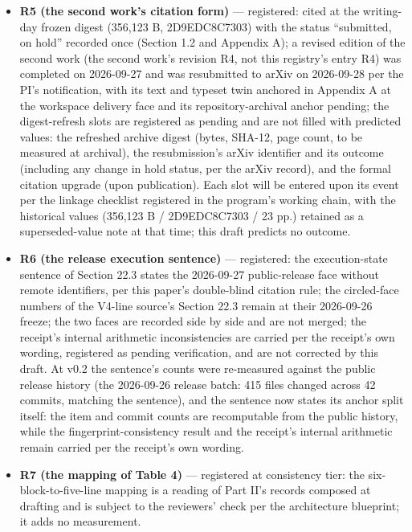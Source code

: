 \documentclass[11pt]{article}
\begin{document}
\begin{itemize}[leftmargin=1.6em,itemsep=2pt,parsep=0pt,topsep=3pt]
citations (E-40.1, E-40.2). The registration follows the R1–R3 precedent of concise, registered facts: the source documents are not transcribed, none of them enters the References, and the confidential-source discipline of C.4 is unaffected—the calibration note and the weekly-report family remain outside the citation surface, carried by fingerprint only.
\item \textbf{R5 (the second work's citation form)} — registered: cited at the writing-day frozen digest (356,123 B, 2D9EDC8C7303) with the status ``submitted, on hold'' recorded once (Section 1.2 and Appendix A); a revised edition of the second work (the second work's revision R4, not this registry's entry R4) was completed on 2026-09-27 and was resubmitted to arXiv on 2026-09-28 per the PI's notification, with its text and typeset twin anchored in Appendix A at the workspace delivery face and its repository-archival anchor pending; the digest-refresh slots are registered as pending and are not filled with predicted values: the refreshed archive digest (bytes, SHA-12, page count, to be measured at archival), the resubmission's arXiv identifier and its outcome (including any change in hold status, per the arXiv record), and the formal citation upgrade (upon publication). Each slot will be entered upon its event per the linkage checklist registered in the program's working chain, with the historical values (356,123 B / 2D9EDC8C7303 / 23 pp.) retained as a superseded-value note at that time; this draft predicts no outcome.
\item \textbf{R6 (the release execution sentence)} — registered: the execution-state sentence of Section 22.3 states the 2026-09-27 public-release face without remote identifiers, per this paper's double-blind citation rule; the circled-face numbers of the V4-line source's Section 22.3 remain at their 2026-09-26 freeze; the two faces are recorded side by side and are not merged; the receipt's internal arithmetic inconsistencies are carried per the receipt's own wording, registered as pending verification, and are not corrected by this draft. At v0.2 the sentence's counts were re-measured against the public release history (the 2026-09-26 release batch: 415 files changed across 42 commits, matching the sentence), and the sentence now states its anchor split itself: the item and commit counts are recomputable from the public history, while the fingerprint-consistency result and the receipt's internal arithmetic remain carried per the receipt's own wording.
\item \textbf{R7 (the mapping of Table 4)} — registered at consistency tier: the six-block-to-five-line mapping is a reading of Part II's records composed at drafting and is subject to the reviewers' check per the architecture blueprint; it adds no measurement.

\end{itemize}
\end{document}

